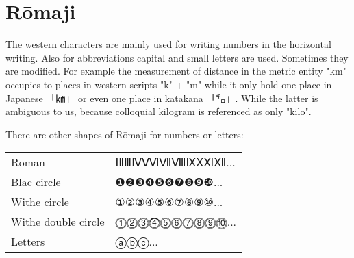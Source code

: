 \section{Rōmaji }
\label{sec:Romaji}



The western characters are mainly used for writing numbers in the horizontal
writing. Also for abbreviations capital and small letters are used. Sometimes
they are modified. For example the measurement of distance in the metric entity
"km" occupies to places in western scripts "k" + "m" while it only hold one
place in Japanese {「㎞」} or even one place in
\hyperref[sec:Katakana]{katakana}  {「㌔」}. While the latter is ambiguous to
us, because colloquial kilogram is referenced as only "kilo".


There are other shapes of Rōmaji for numbers or letters:


\begin{center}
\begin{tabular}{ll}
Roman       &ⅠⅡⅢⅣⅤⅥⅦⅧⅨⅩⅪⅫ...\\
Blac circle & ❶❷❸❹❺❻❼❽❾❿...\\
Withe circle &①②③④⑤⑥⑦⑧⑨⑩...\\
Withe double circle & ⓵⓶⓷⓸⓹⓺⓻⓼⓽⓾...\\
Letters             &ⓐⓑⓒ...\\
\end{tabular}
\end{center}

